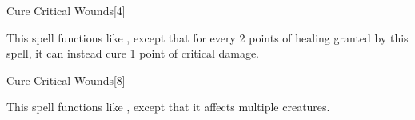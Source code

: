 \begin{spellsection}{Cure Critical Wounds}[4]
    \begin{spellheader}
    \end{spellheader}
    \begin{spellcontent}
        \begin{spelltargetinginfo}
        \end{spelltargetinginfo}
        \begin{spelleffects}
            \spellspecial This spell functions like , except that for every 2 points of healing granted by this spell, it can instead cure 1 point of critical damage.
        \end{spelleffects}
    \end{spellcontent}
    \begin{spellfooter}
        \miscastrandom
    \end{spellfooter}
\end{spellsection}

\begin{spellsection}[Mass]{Cure Critical Wounds}[8]
    \begin{spellheader}
    \end{spellheader}
    \begin{spellcontent}
        \begin{spelltargetinginfo}
        \end{spelltargetinginfo}
        \begin{spelleffects}
            \spellspecial This spell functions like , except that it affects multiple creatures.
        \end{spelleffects}
    \end{spellcontent}
    \begin{spellfooter}
        \miscastexplode
    \end{spellfooter}
\end{spellsection}

